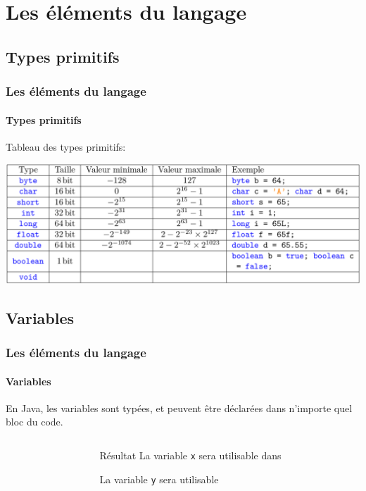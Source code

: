 \section{Les éléments du langage}

	\subsection{Types primitifs}
	
		\begin{frame}
			\frametitle{Les éléments du langage}
			\framesubtitle{Types primitifs}
			Tableau des types primitifs:
			\begin{center}
				\includegraphics[width=1.0\linewidth]{images/typesprimitifs}
			\end{center}
		\end{frame}
			
	
	\subsection{Variables}
	
		\begin{frame}[fragile]
			\frametitle{Les éléments du langage}
			\framesubtitle{Variables}
			\begin{fact}
				En Java, les variables sont typées, et peuvent être déclarées dans n'importe quel bloc du code.
			\end{fact}
			\pause{}
			\begin{columns}
				\begin{column}{0.45\textwidth}
					\begin{example}
						
					\end{example}
				\end{column}
				\begin{column}{0.45\textwidth}
					\pause{}
					\begin{block}{Résultat}
						La variable \lstinline|x| sera utilisable dans \visible<4->{\textcolor{purple}{les blocs 1 et 2}.}
						
						La variable \lstinline|y| sera utilisable \visible<5->{\textcolor{purple}{uniquement dans le bloc 2}.}
					\end{block}
				\end{column}
			\end{columns}
		\end{frame}
	
